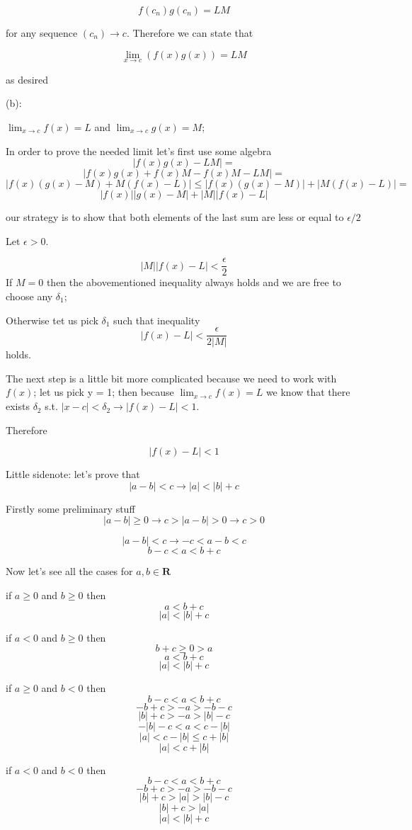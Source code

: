 \documentclass[11pt,oneside,titlepage]{article}
\begin{document}
$$f(c_n)  g(c_n) = L M$$

for any sequence $(c_n) \to c$. Therefore we can state that

$$\lim_{x \to c}(f(x)g(x)) = L M $$

as desired

(b):

$\lim_{x \to c} f(x) = L$ and $\lim_{x \to c} g(x) = M$;

In  order to prove the needed limit let's first use some algebra
$$ |f(x)g(x) - LM| = $$
$$ |f(x)g(x) + f(x)M - f(x)M - LM| = $$
$$|f(x)(g(x) - M) + M(f(x) - L)| \leq
|f(x)(g(x) - M)| + | M(f(x) - L)| = $$
$$|f(x)||g(x) - M| + |M||f(x) - L|  $$

our strategy is to show that both elements of the last sum are less or equal to $\epsilon/2$

Let $\epsilon > 0$.

$$ |M||f(x) - L| < \frac{\epsilon}{2}$$
If $M = 0$ then the abovementioned inequality always holds and we are free to choose any $\delta_1$;

Otherwise tet us pick $\delta_1$ such that inequality
$$ |f(x) - L| < \frac{\epsilon}{2|M|}$$
holds.

The next step is a little bit more complicated because we need to work with $f(x)$; let us pick y = 1;
then because $\lim_{x \to c}f(x) = L$ we know that there exists $\delta_2$ s.t. $|x - c| < \delta_2
\to |f(x) - L| < 1$. 

Therefore

$$|f(x) - L| < 1$$

Little sidenote: let's prove that 
$$ |a - b| < c \to |a| < |b| + c  $$

Firstly some preliminary stuff
$$|a - b| \geq 0 \to c > |a - b| > 0 \to c > 0$$

$$|a - b| < c \to -c < a - b < c$$
$$b -c < a  < b + c$$

Now let's see all the cases for $a, b \in \textbf{R}$

if $a \geq 0$ and $b \geq 0$ then
$$a < b + c$$
$$|a| < |b| + c$$

if $a < 0$ and $b \geq 0$ then
$$ b + c \geq 0 > a$$
$$a < b + c$$
$$|a| < |b| + c$$

if $a \geq 0$ and $b < 0$ then
$$b -c < a  < b + c$$
$$-b +c > -a  > -b - c$$
$$|b| +c > -a  > |b| - c$$
$$-|b| - c  < a  <  c - |b|$$
$$|a|  <  c - |b| \leq c + |b|$$
$$|a|  <  c + |b|$$

if $a < 0$ and $b < 0$ then
$$b -c < a  < b + c$$
$$-b + c > -a  > -b - c$$
$$|b| + c > |a|  > |b| - c$$
$$|b| + c > |a|$$
$$|a| < |b| + c$$
\end{document}
